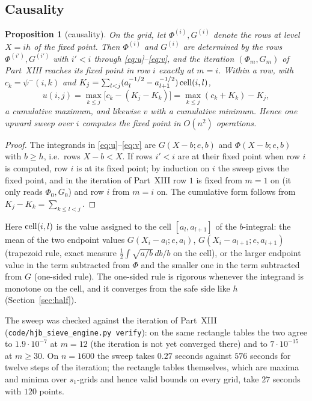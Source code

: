\documentclass[11pt]{amsart}
\newtheorem{proposition}[theorem]{Proposition}
\theoremstyle{remark}
\begin{document}
\subsection{Causality}
\begin{proposition}[causality]\label{prop:causal}
On the grid, let $\Phi^{(i)},G^{(i)}$ denote the rows at level $X=ih$ of the fixed point. Then $\Phi^{(i)}$ and $G^{(i)}$ are determined by the rows $\Phi^{(i')},G^{(i')}$ with $i'<i$ through \eqref{eq:u}--\eqref{eq:v}, and the iteration $(\Phi_m,G_m)$ of Part~XIII reaches its fixed point in row $i$ exactly at $m=i$. Within a row, with $c_k=\psi^-(i,k)$ and $K_j=\sum_{l<j}(a_l^{-1/2}-a_{l+1}^{-1/2})\,{\rm cell}(i,l)$,
\[
u(i,j)=\max_{k\le j}\bigl[c_k-(K_j-K_k)\bigr]=\max_{k\le j}(c_k+K_k)-K_j ,
\]
a cumulative maximum, and likewise $v$ with a cumulative minimum. Hence one upward sweep over $i$ computes the fixed point in $O(n^2)$ operations.
\end{proposition}
\begin{proof}
The integrands in \eqref{eq:u}--\eqref{eq:v} are $G(X-b;e,b)$ and $\Phi(X-b;e,b)$ with $b\ge h$, i.e.\ rows $X-b<X$. If rows $i'<i$ are at their fixed point when row $i$ is computed, row $i$ is at its fixed point; by induction on $i$ the sweep gives the fixed point, and in the iteration of Part~XIII row $1$ is fixed from $m=1$ on (it only reads $\Phi_0,G_0$) and row $i$ from $m=i$ on. The cumulative form follows from $K_j-K_k=\sum_{k\le l<j}$.
\end{proof}
Here ${\rm cell}(i,l)$ is the value assigned to the cell $[a_l,a_{l+1}]$ of the $b$-integral: the mean of the two endpoint values $G(X_i-a_l;e,a_l)$, $G(X_i-a_{l+1};e,a_{l+1})$ (trapezoid rule, exact measure $\frac12\int\sqrt{a/b}\,db/b$ on the cell), or the larger endpoint value in the term subtracted from $\Phi$ and the smaller one in the term subtracted from $G$ (one-sided rule). The one-sided rule is rigorous whenever the integrand is monotone on the cell, and it converges from the safe side like $h$ (Section~\ref{sec:half}).

The sweep was checked against the iteration of Part~XIII (\texttt{code/hjb\_sieve\_engine.py verify}): on the same rectangle tables the two agree to $1.9\cdot10^{-7}$ at $m=12$ (the iteration is not yet converged there) and to $7\cdot10^{-15}$ at $m\ge30$. On $n=1600$ the sweep takes $0.27$ seconds against $576$ seconds for twelve steps of the iteration; the rectangle tables themselves, which are maxima and minima over $s_1$-grids and hence valid bounds on every grid, take $27$ seconds with $120$ points.
\end{document}
